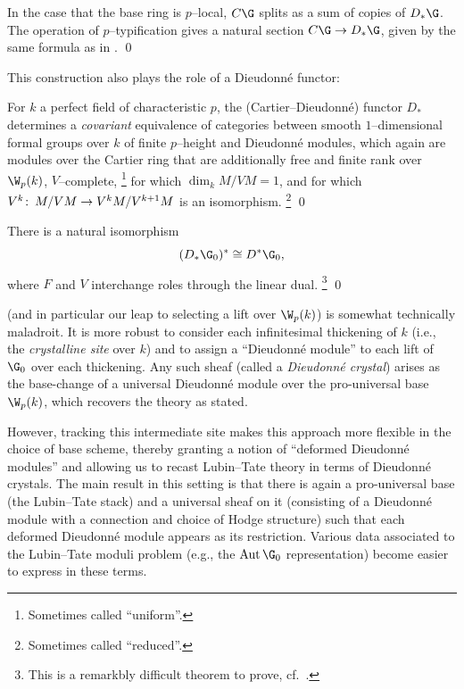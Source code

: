 \begin{lemma}
In the case that the base ring is \(p\)--local, \(C\G\) splits as a sum of copies of \(D_* \G\).
The operation of \(p\)--typification gives a natural section \(C\G \to D_* \G\), given by the same formula as in . \qed
\end{lemma}

This construction also plays the role of a Dieudonn\'e functor:

\begin{theorem}\label{CurveDieudonneTheorem}
For \(k\) a perfect field of characteristic \(p\), the (Cartier--Dieudonn\'e) functor \(D_*\) determines a \emph{covariant} equivalence of categories between smooth \(1\)--dimensional formal groups over \(k\) of finite \(p\)--height and Dieudonn\'e modules, which again are modules over the Cartier ring that are additionally free and finite rank over \(\W_p(k)\), \(V\)--complete,%
\footnote{%
Sometimes called ``uniform''.
}
for which \(\dim_k M / VM = 1\), and for which \(V^k\colon\thinspace M / VM \to V^kM / V^{k+1}M\) is an isomorphism.%
\footnote{%
Sometimes called ``reduced''.
}
\qed
\end{theorem}

\begin{theorem}\label{DieudonneDualityThm}
There is a natural isomorphism \[(D_* \G_0)^* \cong D^* \G_0,\] where \(F\) and \(V\) interchange roles through the linear dual.%
\footnote{%
This is a remarkbly difficult theorem to prove, cf.\ .
}
\pushQED\qed\qedhere\popQED
\end{theorem}

\begin{remark}
 (and in particular our leap to selecting a lift over \(\W_p(k)\)) is somewhat technically maladroit.
It is more robust to consider each infinitesimal thickening of \(k\) (i.e., the \textit{crystalline site} over \(k\)) and to assign a ``Dieudonn\'e module'' to each lift of \(\G_0\) over each thickening.
Any such sheaf (called a \textit{Dieudonn\'e crystal}) arises as the base-change of a universal Dieudonn\'e module over the pro-universal base \(\W_p(k)\), which recovers the theory as stated.

However, tracking this intermediate site makes this approach more flexible in the choice of base scheme, thereby granting a notion of ``deformed Dieudonn\'e modules'' and allowing us to recast Lubin--Tate theory in terms of Dieudonn\'e crystals.
The main result in this setting is that there is again a pro-universal base (the Lubin--Tate stack) and a universal sheaf on it (consisting of a Dieudonn\'e module with a connection and choice of Hodge structure) such that each deformed Dieudonn\'e module appears as its restriction.
Various data associated to the Lubin--Tate moduli problem (e.g., the \(\Aut \G_0\) representation) become easier to express in these terms.
\end{remark}


